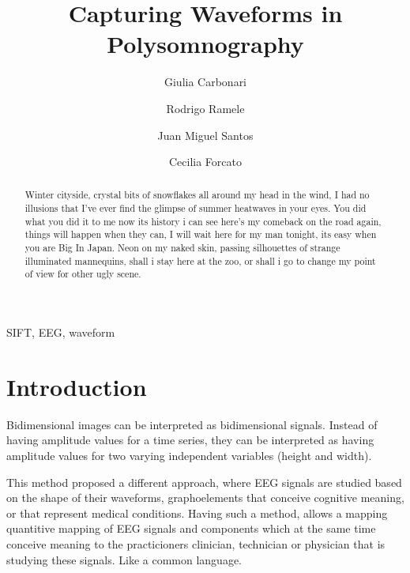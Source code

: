 \documentclass[review]{elsarticle}
\begin{document}
\begin{frontmatter}

\title{Capturing Waveforms in Polysomnography}

\author{Giulia Carbonari}
\author{Rodrigo Ramele}
\author{Juan Miguel Santos}
\author{Cecilia Forcato}
\address{Instituto Tecnológico de Buenos Aires}




\begin{abstract}
Winter cityside, crystal bits of snowflakes all around my head in the wind, I had no illusions that I've ever find the glimpse of summer heatwaves in your eyes. You did what you did it to me now its history i can see here's my comeback on the road again, things will happen when they can, I will wait here for my man tonight, its easy when you are Big In Japan.
Neon on my naked skin, passing silhouettes of strange illuminated mannequins, shall i stay here at the zoo, or shall i go to change my point of view for other ugly scene.
\end{abstract}

\begin{keyword}
SIFT, EEG, waveform
\end{keyword}

\end{frontmatter}

\linenumbers

\section{Introduction}

Bidimensional images can be interpreted as bidimensional signals.   Instead of having amplitude values for a time series, they can be interpreted as having amplitude values for two varying independent variables (height and width).

This method proposed a different approach, where EEG signals are studied based on the shape of their waveforms, graphoelements that conceive cognitive meaning, or that represent medical conditions.  Having such a method, allows a mapping quantitive mapping of EEG signals and components which at the same time conceive meaning to the practicioners clinician, technician or physician that is studying these signals.  Like a common language.
\end{document}
